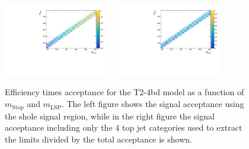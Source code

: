 \begin{figure}[h!]
  \begin{center}
    \includegraphics[width=0.4\textwidth]{figures/jetRanking/T2-4bd/eff/T2-4bd_merging_9_cats.pdf} ~~
    \includegraphics[width=0.4\textwidth]{figures/susyResults/T2-4bd_doubleRatioAcceptance.pdf} \\
    \caption{
      Efficiency times acceptance for the T2-4bd model as a function of $m_{\mathrm{Stop}}$ and $m_{\mathrm{LSP}}$.
      The left figure shows the signal acceptance using the shole signal region, 
      while in the right figure the signal acceptance including only the 4 top jet categories used to extract the limits divided by the total acceptance is shown.
    }
    \label{fig:sig-eff-T2-4bd}
  \end{center}
\end{figure}

